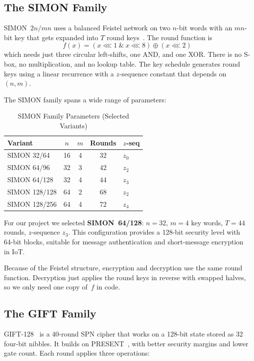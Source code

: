 \documentclass[conference]{IEEEtran}
\begin{document}
\subsection{The SIMON Family}

SIMON~$2n/mn$ uses a balanced Feistel network on two $n$-bit words with an
$mn$-bit key that gets expanded into $T$ round keys~\cite{beaulieu2013simon}.
The round function is
\[
f(x) = (x \lll 1\ \&\ x \lll 8) \oplus (x \lll 2)
\]
which needs just three circular left-shifts, one AND, and one XOR.  There
is no S-box, no multiplication, and no lookup table.  The key schedule generates round
keys using a linear recurrence with a $z$-sequence constant that depends on
$(n, m)$.

The SIMON family spans a wide range of parameters:

\begin{table}[htbp]
\caption{SIMON Family Parameters (Selected Variants)}
\label{tab:simonfamily}
\centering
\begin{tabular}{lcccl}
\toprule
\textbf{Variant} & $n$ & $m$ & \textbf{Rounds} & $z$\textbf{-seq} \\
\midrule
SIMON 32/64  & 16 & 4 & 32 & $z_0$ \\
SIMON 64/96  & 32 & 3 & 42 & $z_2$ \\
SIMON 64/128 & 32 & 4 & 44 & $z_3$ \\
SIMON 128/128 & 64 & 2 & 68 & $z_2$ \\
SIMON 128/256 & 64 & 4 & 72 & $z_4$ \\
\bottomrule
\end{tabular}
\end{table}

For our project we selected \textbf{SIMON~64/128}: $n=32$, $m=4$ key
words, $T=44$ rounds, $z$-sequence $z_3$.  This configuration provides a
128-bit security level with 64-bit blocks, suitable for message
authentication and short-message encryption in IoT.

Because of the Feistel structure, encryption and decryption use the same
round function.  Decryption just applies the round keys in reverse with
swapped halves, so we only need one copy of~$f$ in code.

\subsection{The GIFT Family}

GIFT-128~\cite{banik2017gift} is a 40-round SPN cipher that works on a
128-bit state stored as 32 four-bit nibbles.  It builds on PRESENT~\cite{bogdanov2007present}, with better security margins and lower
gate count.  Each round applies three operations:
\end{document}
